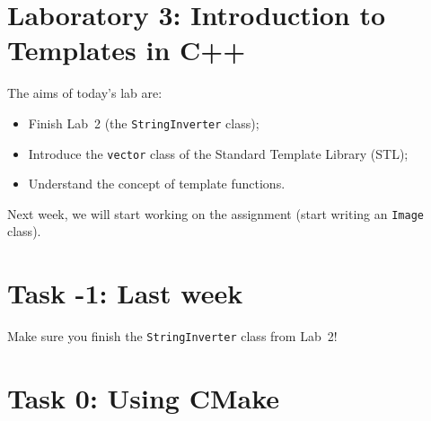 
\section*{Laboratory 3: Introduction to Templates in C++}

%
%
%
%    
%    

The aims of today's lab are:
\begin{itemize}
\item Finish Lab~2 (the \verb+StringInverter+ class);
\item Introduce the \verb+vector+ class of the Standard Template Library (STL);
\item Understand the concept of template functions. 
\end{itemize}

Next week, we will start working on the assignment (start writing an \verb+Image+ class).

\section*{Task -1: Last week}

Make sure you finish the \verb+StringInverter+ class from Lab~2!

\section*{Task 0: Using CMake}

